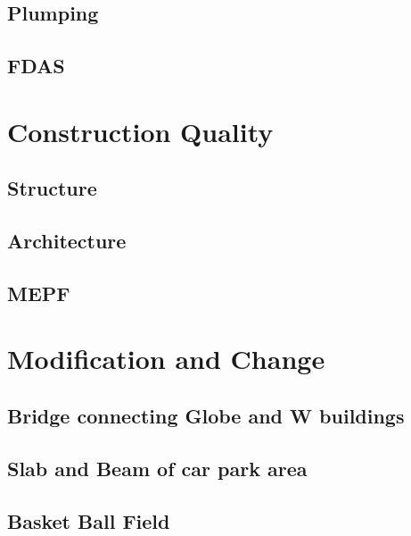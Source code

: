 \documentclass[9pt,twoside,lineno]{pnas-new}
\begin{document}
\subsection{Plumping}


\subsection{FDAS}




\section{Construction Quality}
\subsection{Structure}

\subsection{Architecture}


\subsection{MEPF}

\section{Modification and Change}
\subsection{Bridge connecting Globe and W buildings}

\subsection{Slab and Beam of car park area}

\subsection{Basket Ball Field}







\showacknow %

%
\end{document}
